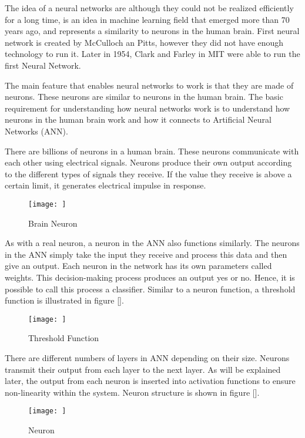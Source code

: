 The idea of a neural networks are although they could not be realized efficiently for a long time, is an idea in machine learning field that emerged more than 70 years ago, and represents a similarity to neurons in the human brain. First neural network is created by McCulloch an Pitts, however they did not have enough technology to run it. Later in 1954, Clark and Farley in MIT were able to run the first Neural Network.

The main feature that enables neural networks to work is that they are made of neurons. These neurons are similar to neurons in the human brain. The basic requirement for understanding how neural networks work is to understand how neurons in the human brain work and how it connects to Artificial Neural Networks (ANN).

There are billions of neurons in a human brain. These neurons communicate with each other using electrical signals. Neurons produce their own output according to the different types of signals they receive. If the value they receive is above a certain limit, it generates electrical impulse in response.

\begin{figure}[h]
    \centering
    \texttt{[image: ]}
    \caption{Brain Neuron}
    \label{fig:my_label}
\end{figure}

As with a real neuron, a neuron in the ANN also functions similarly. The neurons in the ANN simply take the input they receive and process this data and then give an output. Each neuron in the network has its own parameters called weights. This decision-making process produces an output yes or no. Hence, it is possible to call this process a classifier. Similar to a neuron function, a threshold function is illustrated in figure [].

\begin{figure}[h]
    \centering
    \texttt{[image: ]}
    \caption{Threshold Function}
    \label{fig:my_label}
\end{figure}

There are different numbers of layers in ANN depending on their size. Neurons transmit their output from each layer to the next layer. As will be explained later, the output from each neuron is inserted into activation functions to ensure non-linearity within the system. Neuron structure is shown in figure [].

\begin{figure}[h]
    \centering
    \texttt{[image: ]}
    \caption{Neuron}
    \label{fig:my_label}
\end{figure}


